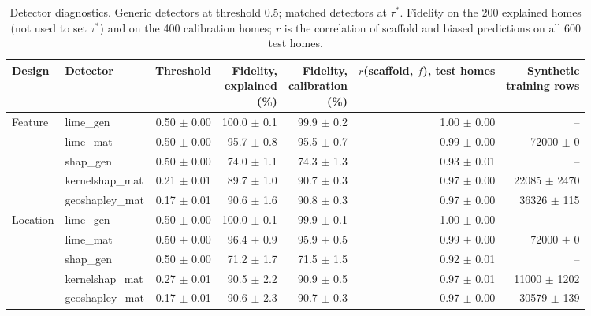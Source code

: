 \begin{table}[t]
\centering
\footnotesize
\setlength{\tabcolsep}{3.5pt}
\begin{adjustbox}{max width=\linewidth}
\begin{tabular}{llrrrrr}
\toprule
Design & Detector & Threshold & \makecell[b]{Fidelity, \\ explained \\ (\%)} & \makecell[b]{Fidelity, \\ calibration \\ (\%)} & \makecell[b]{$r$(scaffold, \\ $f$), test \\ homes} & \makecell[b]{Synthetic \\ training rows} \\
\midrule
Feature & lime\_gen & 0.50 $\pm$ 0.00 & 100.0 $\pm$ 0.1 & 99.9 $\pm$ 0.2 & 1.00 $\pm$ 0.00 & -- \\
 & lime\_mat & 0.50 $\pm$ 0.00 & 95.7 $\pm$ 0.8 & 95.5 $\pm$ 0.7 & 0.99 $\pm$ 0.00 & 72000 $\pm$ 0 \\
 & shap\_gen & 0.50 $\pm$ 0.00 & 74.0 $\pm$ 1.1 & 74.3 $\pm$ 1.3 & 0.93 $\pm$ 0.01 & -- \\
 & kernelshap\_mat & 0.21 $\pm$ 0.01 & 89.7 $\pm$ 1.0 & 90.7 $\pm$ 0.3 & 0.97 $\pm$ 0.00 & 22085 $\pm$ 2470 \\
 & geoshapley\_mat & 0.17 $\pm$ 0.01 & 90.6 $\pm$ 1.6 & 90.8 $\pm$ 0.3 & 0.97 $\pm$ 0.00 & 36326 $\pm$ 115 \\
\midrule
Location & lime\_gen & 0.50 $\pm$ 0.00 & 100.0 $\pm$ 0.1 & 99.9 $\pm$ 0.1 & 1.00 $\pm$ 0.00 & -- \\
 & lime\_mat & 0.50 $\pm$ 0.00 & 96.4 $\pm$ 0.9 & 95.9 $\pm$ 0.5 & 0.99 $\pm$ 0.00 & 72000 $\pm$ 0 \\
 & shap\_gen & 0.50 $\pm$ 0.00 & 71.2 $\pm$ 1.7 & 71.5 $\pm$ 1.5 & 0.92 $\pm$ 0.01 & -- \\
 & kernelshap\_mat & 0.27 $\pm$ 0.01 & 90.5 $\pm$ 2.2 & 90.9 $\pm$ 0.5 & 0.97 $\pm$ 0.01 & 11000 $\pm$ 1202 \\
 & geoshapley\_mat & 0.17 $\pm$ 0.01 & 90.6 $\pm$ 2.3 & 90.7 $\pm$ 0.3 & 0.97 $\pm$ 0.00 & 30579 $\pm$ 139 \\
\bottomrule
\end{tabular}
\end{adjustbox}
\caption{Detector diagnostics. Generic detectors at threshold 0.5; matched detectors at $\tau^*$. Fidelity on the 200 explained homes (not used to set $\tau^*$) and on the 400 calibration homes; $r$ is the correlation of scaffold and biased predictions on all 600 test homes.}
\label{tab:detectors}
\end{table}
